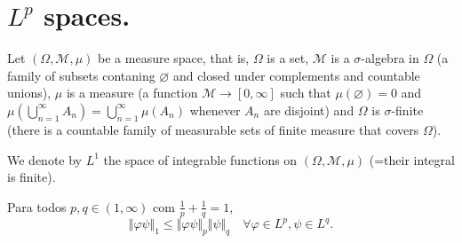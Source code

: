 \documentclass{article}
\theoremstyle{definition}
\numberwithin{equation}{section}
\begin{document}
	\section{$L^p$ spaces.}
	Let $(\Omega,\mathcal{M},\mu)$ be a measure space, that is, $\Omega$ is a set, $\mathcal{M}$ is a $\sigma$-algebra in $\Omega$ (a family of subsets contaning $\varnothing$ and closed under complements and countable unions), $\mu$ is a measure (a function $\mathcal{M}\to[0,\infty]$ such that $\mu(\varnothing)=0$ and $\mu\left(\bigcup_{n=1}^\infty A_n\right)=\bigcup_{n=1}^\infty\mu(A_n)$ whenever $A_n$ are disjoint) and $\Omega$ is $\sigma$-finite (there is a countable family of measurable sets of finite measure that covers $\Omega$).
	
	We denote by $L^1$ the space of integrable functions on $(\Omega,\mathcal{M},\mu)$ (=their integral is finite).
	\begin{thm}
		Para todos $p,q\in(1,\infty)$ com $\frac{1}{p}+\frac{1}{q}=1$,
		\[\Vert\varphi\psi\Vert_1\leq\Vert \varphi\psi\Vert_p\Vert\psi\Vert_q\quad\forall\varphi\in L^p,\psi\in L^q.\]
	\end{thm}
\end{document}
